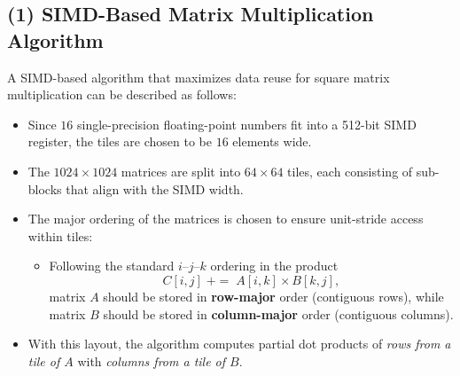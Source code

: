 \documentclass[a4 paper]{article}
\begin{document}

\subsection*{(1) SIMD-Based Matrix Multiplication Algorithm}

A SIMD-based algorithm that maximizes data reuse for square matrix multiplication can be described as follows:

\begin{itemize}
    \item Since $16$ single-precision floating-point numbers fit into a 512-bit SIMD register, the tiles are chosen to be $16$ elements wide.
    \item The $1024 \times 1024$ matrices are split into $64 \times 64$ tiles, each consisting of sub-blocks that align with the SIMD width.
    \item The major ordering of the matrices is chosen to ensure unit-stride access within tiles:
    \begin{itemize}
        \item Following the standard $i$--$j$--$k$ ordering in the product
        \[
            C[i,j] \; += \; A[i,k] \times B[k,j],
        \]
        matrix $A$ should be stored in \textbf{row-major} order (contiguous rows),
        while matrix $B$ should be stored in \textbf{column-major} order (contiguous columns).
    \end{itemize}
    \item With this layout, the algorithm computes partial dot products of
    \textit{rows from a tile of $A$} with \textit{columns from a tile of $B$}.
\end{itemize}
\end{document}
